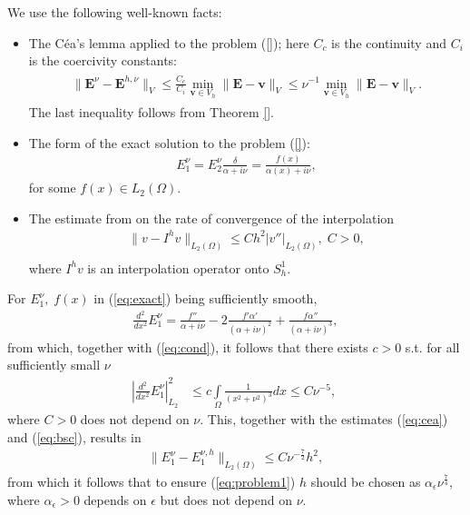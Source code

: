 \documentclass[proc]{edpsmath}
\begin{document}
We use the following well-known facts:
\begin{itemize}
 \item The C\'ea's lemma applied to the problem (\ref{}); here $C_c$ is the continuity and $C_i$ is the coercivity constants:
\begin{align}
\label{eq:cea}
\begin{split}
 \|\mathbf{E}^{\nu}-\mathbf{E}^{h,\nu}\|_{V}\leq \frac{C_c}{C_i}\min_{\mathbf{v}\in V_h}\|\mathbf{E}-\mathbf{v}\|_{V}
 \leq \nu^{-1}\min_{\mathbf{v}\in V_h}\|\mathbf{E}-\mathbf{v}\|_{V}.
 \end{split}
\end{align}
The last inequality follows from Theorem \ref{}.  
\item The form of the exact solution to the problem (\ref{}):
\begin{align}
\label{eq:exact}
 E_{1}^{\nu}=E_{2}^{\nu}\frac{\delta}{\alpha+i\nu}=\frac{f(x)}{\alpha(x)+i\nu},
\end{align}
for some $f(x)\in L_{2}(\Omega)$.
\item The estimate from \cite[Chapter 0]{Brenner_Scott} on the rate of convergence of the interpolation 
\begin{align}
\label{eq:bsc}
 \|v-I^{h}v\|_{L_{2}(\Omega)}\leq Ch^2|v''|_{L_{2}(\Omega)},\; C>0,\\
\end{align}
where $I^{h}v$ is an interpolation operator onto $S_{h}^{1}$.
\end{itemize}
For $E_{1}^{\nu},\;f(x)$ in (\ref{eq:exact}) being sufficiently smooth, 
\begin{align*}
 \frac{d^2}{dx^2}E_{1}^{\nu}=\frac{f''}{\alpha+i\nu}-2\frac{f'\alpha'}{(\alpha+i\nu)^2}+\frac{f\alpha''}{(\alpha+i\nu)^3},
\end{align*}
from which, together with (\ref{eq:cond}), it follows that there exists $c>0$ s.t. for all sufficiently small $\nu$ 
\begin{align*}
 \left|  \frac{d^2}{dx^2}E_{1}^{\nu}\right|_{L_2}^{2}&\leq c\int\limits_{\Omega}\frac{1}{(x^2+\nu^2)^{3}}dx
 \leq C\nu^{-5},\; 
\end{align*}
where $C>0$ does not depend on $\nu$. This, together with the estimates (\ref{eq:cea}) and (\ref{eq:bsc}), results in 
\begin{align*}
 \|E^{\nu}_{1}-E^{\nu,h}_{1}\|_{L_{2}(\Omega)}\leq C\nu^{-\frac{7}{2}}h^2,
\end{align*}
from which it follows that to ensure (\ref{eq:problem1}) $h$ should be chosen as $\alpha_{\epsilon}\nu^{\frac{7}{4}}$, 
where $\alpha_{\epsilon}>0$ depends on $\epsilon$ but does not depend on $\nu$. 
\end{document}
